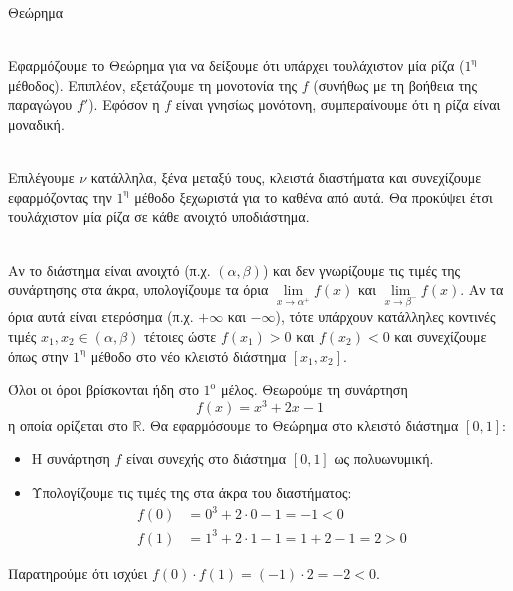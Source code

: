 \begin{askhsh}{Θεώρημα }
\begin{tropos}
\item {}\\
Εφαρμόζουμε το Θεώρημα  για να δείξουμε ότι υπάρχει τουλάχιστον μία ρίζα  ($1^\text{η}$ μέθοδος). Επιπλέον, εξετάζουμε τη μονοτονία της $f$ (συνήθως με τη βοήθεια της παραγώγου $f'$). Εφόσον η $f$ είναι γνησίως μονότονη, συμπεραίνουμε ότι η ρίζα είναι μοναδική.

\item {}\\
Επιλέγουμε $\nu$ κατάλληλα, ξένα μεταξύ τους, κλειστά διαστήματα και συνεχίζουμε εφαρμόζοντας την $1^\text{η}$ μέθοδο ξεχωριστά για το καθένα από αυτά. Θα προκύψει έτσι τουλάχιστον μία ρίζα σε κάθε ανοιχτό υποδιάστημα.

\item {}\\
Αν το διάστημα είναι ανοιχτό (π.χ. $(\alpha, \beta)$) και δεν γνωρίζουμε τις τιμές της συνάρτησης στα άκρα, υπολογίζουμε τα όρια $\lim\limits_{x\to \alpha^+} f(x)$ και $\lim\limits_{x\to \beta^-} f(x)$. Αν τα όρια αυτά είναι ετερόσημα (π.χ. $+\infty$ και $-\infty$), τότε υπάρχουν κατάλληλες κοντινές τιμές $x_1, x_2 \in (\alpha, \beta)$ τέτοιες ώστε $f(x_1) > 0$ και $f(x_2) < 0$ και συνεχίζουμε όπως στην $1^\text{η}$ μέθοδο στο νέο κλειστό διάστημα $[x_1, x_2]$.
\end{tropos}
\end{askhsh}


\lysh
Όλοι οι όροι βρίσκονται ήδη στο $1^\text{ο}$ μέλος. Θεωρούμε τη συνάρτηση 
\[ f(x) = x^3 + 2x - 1 \]
η οποία ορίζεται στο $\mathbb{R}$. Θα εφαρμόσουμε το Θεώρημα  στο κλειστό διάστημα $[0, 1]$:
\begin{itemize}
    \item Η συνάρτηση $f$ είναι συνεχής στο διάστημα $[0, 1]$ ως πολυωνυμική.
    \item Υπολογίζουμε τις τιμές της στα άκρα του διαστήματος:
    \begin{align*}
        f(0) &= 0^3 + 2\cdot 0 - 1 = -1 < 0 \\
        f(1) &= 1^3 + 2\cdot 1 - 1 = 1 + 2 - 1 = 2 > 0
    \end{align*}
\end{itemize}
Παρατηρούμε ότι ισχύει $f(0) \cdot f(1) = (-1) \cdot 2 = -2 < 0$. 


